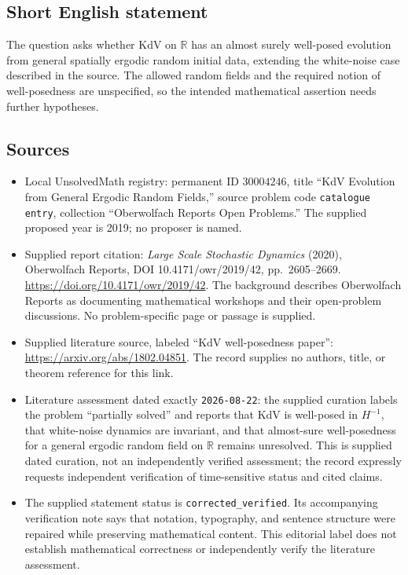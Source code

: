 \documentclass[11pt]{article}
\newcommand{\R}{\mathbb{R}}
\begin{document}
\subsection{Short English statement}
The question asks whether KdV on \(\R\) has an almost surely well-posed evolution from general spatially ergodic random initial data, extending the white-noise case described in the source. The allowed random fields and the required notion of well-posedness are unspecified, so the intended mathematical assertion needs further hypotheses.
\subsection{Sources}
\begin{itemize}
\item Local UnsolvedMath registry: permanent ID \(30004246\), title ``KdV Evolution from General Ergodic Random Fields,'' source problem code \texttt{catalogue entry}, collection ``Oberwolfach Reports Open Problems.'' The supplied proposed year is 2019; no proposer is named.
\item Supplied report citation: \emph{Large Scale Stochastic Dynamics} (2020), Oberwolfach Reports, DOI 10.4171/owr/2019/42, pp.\ 2605--2669. \url{https://doi.org/10.4171/owr/2019/42}. The background describes Oberwolfach Reports as documenting mathematical workshops and their open-problem discussions. No problem-specific page or passage is supplied.
\item Supplied literature source, labeled ``KdV well-posedness paper'': \url{https://arxiv.org/abs/1802.04851}. The record supplies no authors, title, or theorem reference for this link.
\item Literature assessment dated exactly \texttt{2026-08-22}: the supplied curation labels the problem ``partially solved'' and reports that KdV is well-posed in \(H^{-1}\), that white-noise dynamics are invariant, and that almost-sure well-posedness for a general ergodic random field on \(\R\) remains unresolved. This is supplied dated curation, not an independently verified assessment; the record expressly requests independent verification of time-sensitive status and cited claims.
\item The supplied statement status is \texttt{corrected\_verified}. Its accompanying verification note says that notation, typography, and sentence structure were repaired while preserving mathematical content. This editorial label does not establish mathematical correctness or independently verify the literature assessment.
\end{itemize}
\end{document}
